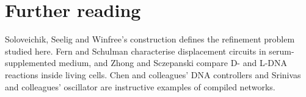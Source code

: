 \section*{Further reading}
Soloveichik, Seelig and Winfree's construction defines the refinement problem
studied here.\cite{Soloveichik2010} Fern and Schulman characterise displacement
circuits in serum-supplemented medium,\cite{FernSchulman2017} and Zhong and
Sczepanski compare D- and L-DNA reactions inside living cells.\cite{ZhongSczepanski2021}
Chen and colleagues' DNA controllers\cite{Chen2013} and Srinivas and colleagues'
oscillator\cite{Srinivas2017} are instructive examples of compiled networks.

